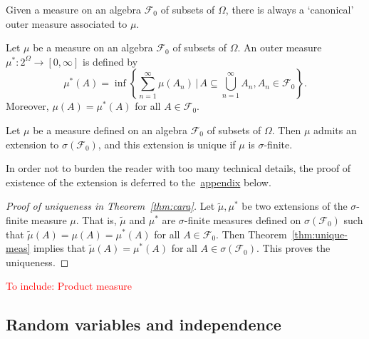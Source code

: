 Given a measure on an algebra $\mathcal{F}_0$ of subsets of $\Omega$, there is always a `canonical' outer measure associated to $\mu$.
\begin{exercise}
\label{exer:outer-measure}
    Let $\mu$ be a measure on an algebra $\mathcal{F}_0$ of subsets of $\Omega$. An outer measure $\mu^*:2^{\Omega}\to [0,\infty]$ is defined by
    \begin{equation}
        \mu^*(A) = \inf\left\{ \sum_{n=1}^\infty \mu(A_n) \,\bigg\vert\, A\subseteq\bigcup_{n=1}^\infty A_n, A_n\in\mathcal{F}_0\right\}.
    \end{equation}
    Moreover, $\mu(A)=\mu^*(A)$ for all $A\in\mathcal{F}_0$.
\end{exercise}

\begin{theorem}
\label{thm:cara}
    Let $\mu$ be a measure defined on an algebra $\mathcal{F}_0$ of subsets of $\Omega$. Then $\mu$ admits an extension to $\sigma(\mathcal{F}_0)$, and this extension is unique if $\mu$ is $\sigma$-finite.
\end{theorem}

In order not to burden the reader with too many technical details, the proof of existence of the extension is deferred to the~\hyperref[subsec:supple2]{appendix} below.
\begin{proof}[Proof of uniqueness in Theorem~\ref{thm:cara}]
    Let $\tilde{\mu},\mu^*$ be two extensions of the $\sigma$-finite measure $\mu$. That is, $\tilde{\mu}$ and $\mu^*$ are $\sigma$-finite measures defined on $\sigma(\mathcal{F}_0)$ such that $\tilde{\mu}(A)=\mu(A)=\mu^*(A)$ for all $A\in\mathcal{F}_0$. Then Theorem~\ref{thm:unique-meas} implies that $\tilde{\mu}(A)=\mu^*(A)$ for all $A\in\sigma(\mathcal{F}_0)$. This proves the uniqueness.
\end{proof}

\textcolor{red}{To include: Product measure}

\subsection{Random variables and independence}

